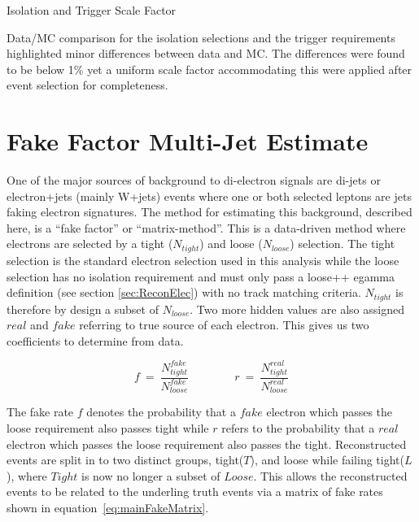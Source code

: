    {\bf\raggedright Isolation and Trigger Scale Factor}

   {\raggedright Data/MC comparison for the isolation selections and the trigger requirements highlighted minor differences between data and MC. The differences were found to be below 1\% yet a uniform scale factor accommodating this were applied after event selection for completeness.}




\section{Fake Factor Multi-Jet Estimate}
   \label{sec:FFmethod}

One of the major sources of background to di-electron signals are di-jets or electron+jets (mainly W+jets) events where one or both selected leptons are jets faking electron signatures. The method for estimating this background, described here, is a ``fake factor'' or ``matrix-method''. This is a data-driven method where electrons are selected by a tight ($N_{tight}$) and loose ($N_{loose}$) selection. The tight selection is the standard electron selection used in this analysis while the loose selection has no isolation requirement and must only pass a loose++ egamma definition (see section \ref{sec:ReconElec}) with no track matching criteria. $N_{tight}$ is therefore by design a subset of $N_{loose}$. Two more hidden values are also assigned $real$ and $fake$ referring to true source of each electron. This gives us two coefficients to determine from data.

\begin{equation} \label{eq:fakeRate}
   f~=~\frac{N^{fake}_{tight}}{N^{fake}_{loose}} \qquad \qquad r~=~\frac{N^{real}_{tight}}{N^{real}_{loose}}
\end{equation}

The fake rate $f$ denotes the probability that a $fake$ electron which passes the loose requirement also passes tight while $r$ refers to the probability that a $real$ electron which passes the loose requirement also passes the tight.
Reconstructed events are split in to two distinct groups, tight($T$), and loose while failing tight($L$), where $Tight$ is now no longer a subset of $Loose$. This allows the reconstructed events to be related to the underling truth events via a matrix of fake rates shown in equation~\ref{eq:mainFakeMatrix}.

